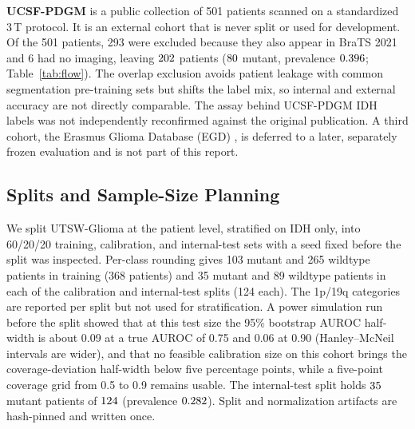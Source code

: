 \documentclass[journal]{IEEEtran}
\begin{document}
\textbf{UCSF-PDGM} \cite{calabrese2022ucsf} is a public collection of 501 patients scanned on a standardized 3\,T protocol. It is an external cohort that is never split or used for development. Of the 501 patients, 293 were excluded because they also appear in BraTS 2021 and 6 had no imaging, leaving $202$ patients ($80$ mutant, prevalence $0.396$; Table~\ref{tab:flow}). The overlap exclusion avoids patient leakage with common segmentation pre-training sets but shifts the label mix, so internal and external accuracy are not directly comparable. The assay behind UCSF-PDGM IDH labels was not independently reconfirmed against the original publication. A third cohort, the Erasmus Glioma Database (EGD) \cite{vandervoort2021egd}, is deferred to a later, separately frozen evaluation and is not part of this report.

\begin{table}[t]
\centering
\caption{Cohort Flow (Counts Only)}
\label{tab:flow}
\footnotesize

\end{table}

\subsection{Splits and Sample-Size Planning}
We split UTSW-Glioma at the patient level, stratified on IDH only, into 60/20/20 training, calibration, and internal-test sets with a seed fixed before the split was inspected. Per-class rounding gives 103 mutant and 265 wildtype patients in training (368 patients) and 35 mutant and 89 wildtype patients in each of the calibration and internal-test splits (124 each). The 1p/19q categories are reported per split but not used for stratification. A power simulation run before the split showed that at this test size the 95\% bootstrap AUROC half-width is about 0.09 at a true AUROC of 0.75 and 0.06 at 0.90 (Hanley--McNeil intervals are wider), and that no feasible calibration size on this cohort brings the coverage-deviation half-width below five percentage points, while a five-point coverage grid from 0.5 to 0.9 remains usable. The internal-test split holds $35$ mutant patients of $124$ (prevalence $0.282$). Split and normalization artifacts are hash-pinned and written once.
\end{document}
